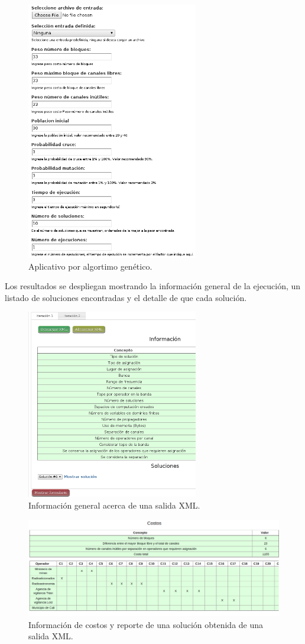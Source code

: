\begin{multicols}{2}
\begin{figure}[H]
	\centering
	\includegraphics[width=7.5cm]{Anexos/Imagenes/ManualUsuario/genetico.png}
	\caption{ Aplicativo por algortimo genético.}
\end{figure}

Los resultados se despliegan mostrando la información general de la ejecución, un listado de soluciones encontradas y el detalle de que cada solución.

\begin{figure}[H]
	\centering
	\includegraphics[width=7.5cm]{Anexos/Imagenes/ManualUsuario/Resultados.png}
	\caption{ Información general acerca de una salida XML.}
\end{figure}

\end{multicols} 

\begin{figure}[H]
	\centering
	\includegraphics[width=15cm]{Anexos/Imagenes/ManualUsuario/ResultadosCostos.png}
	\caption{ Información de costos y reporte de una solución obtenida de una salida XML.}
\end{figure}




